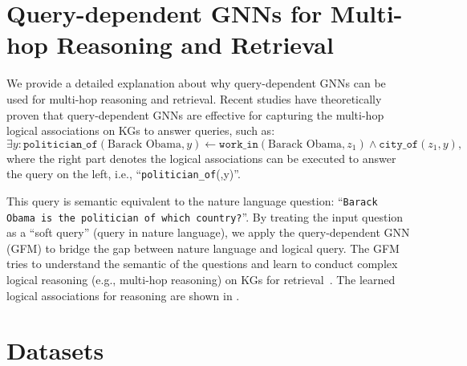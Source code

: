 \section{Query-dependent GNNs for Multi-hop Reasoning and Retrieval}\label{app:theory}
We provide a detailed explanation about why query-dependent GNNs can be used for multi-hop reasoning and retrieval. Recent studies \citep{huang2023theory,qiuunderstanding} have theoretically proven that query-dependent GNNs are effective for capturing the multi-hop logical associations on KGs to answer queries, such as:
\begin{equation}
    \exists y: \texttt{politician\_of}(\text{Barack Obama},y) \leftarrow \texttt{work\_in}(\text{Barack Obama},z_1) \wedge \texttt{city\_of}(z_1, y),
\end{equation}
where the right part denotes the logical associations can be executed to answer the query on the left, i.e., ``\texttt{politician\_of}(,y)''.

This query is semantic equivalent to the nature language question: ``\texttt{Barack Obama is the politician of which country?}''. By treating the input question as a ``soft query'' (query in nature language), we apply the query-dependent GNN (GFM) to bridge the gap between nature language and logical query. The GFM tries to understand the semantic of the questions and learn to conduct complex logical reasoning (e.g., multi-hop reasoning) on KGs for retrieval~\citep{yasunaga2021qa}. The learned logical associations for reasoning are shown in .



\section{Datasets}\label{app:datasets}
